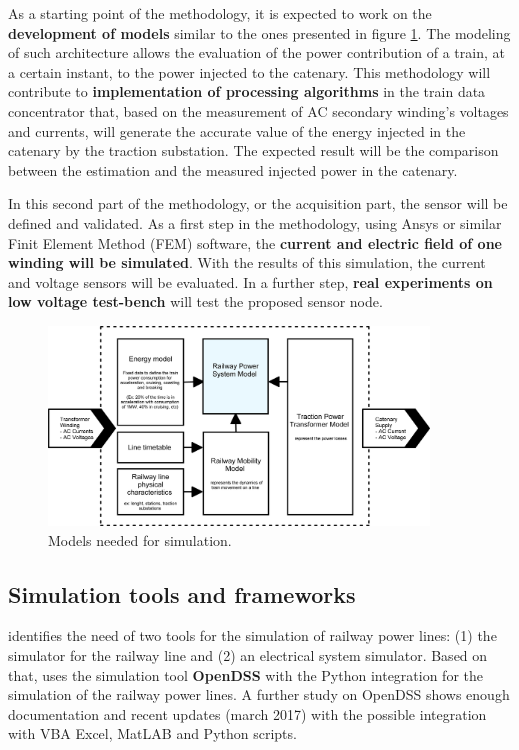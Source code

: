 As a starting point of the methodology, it is expected to work on the \textbf{development of models} similar to the ones presented in figure \ref{fig:4.methodElectrical}. The modeling of such architecture allows the evaluation of the power contribution of a train, at a certain instant, to the power injected to the catenary. This methodology will contribute to \textbf{implementation of processing algorithms} in the train data concentrator that, based on the measurement of AC secondary winding's voltages and currents, will generate the accurate value of the energy injected in the catenary by the traction substation. The expected result will be the comparison between the estimation and the measured injected power in the catenary.

In this second part of the methodology, or the acquisition part, the sensor will be defined and validated. As a first step in the methodology, using Ansys or similar Finit Element Method (FEM) software, the \textbf{current and electric field of one winding will be simulated}. With the results of this simulation, the current and voltage sensors will be evaluated. In a further step, \textbf{real experiments on low voltage test-bench} will test the proposed sensor node.



\begin{figure}[h!]
	\centering
	\includegraphics[width=0.9\textwidth,keepaspectratio]{figures/4.Method/methodElectrical}
	\caption{Models needed for simulation.}
	\label{fig:4.methodElectrical}
\end{figure}



\subsection{Simulation tools and frameworks}

\cite{pilo2000} identifies the need of two tools for the simulation of railway power lines: (1) the simulator for the railway line and (2) an electrical system simulator. Based on that, \cite{almagro2017} uses the simulation tool \textbf{OpenDSS} with the Python integration for the simulation of the railway power lines. A further study on OpenDSS shows enough documentation and recent updates (march 2017) with the possible integration with VBA Excel, MatLAB and Python scripts.

